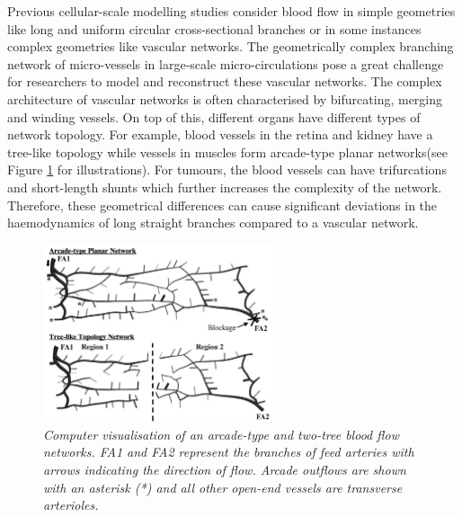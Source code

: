 \noindent Previous cellular-scale modelling studies consider blood flow in simple geometries like long and uniform circular cross-sectional branches or in some instances complex geometries like vascular networks. The geometrically complex branching network of micro-vessels in large-scale micro-circulations pose a great challenge for researchers to model and reconstruct these vascular networks. The complex architecture of vascular networks is often characterised by bifurcating, merging and winding vessels.\cite{fung2013biomechanics} On top of this, different organs have different types of network topology. For example, blood vessels in the retina and kidney have a tree-like topology\cite{LiYiwen2008Dlav} while vessels in muscles form arcade-type planar networks\cite{KianiM1994Fimb, tawfik2013mathematical}(see Figure \ref{BloodNetworkTopology} for illustrations). For tumours, the blood vessels can have trifurcations and short-length shunts which further increases the complexity of the network.\cite{TumorMicrovasculature} Therefore, these geometrical differences can cause significant deviations in the haemodynamics of long straight branches compared to a vascular network.

\begin{figure}[H]
\centering
\includegraphics[width=0.6\textwidth]{images/TopologyNetworks.png}
\caption{\textit{Computer visualisation of an arcade-type and two-tree blood flow networks.\cite{NetworkTopology2005} FA1 and FA2 represent the branches of feed arteries with arrows indicating the direction of flow. Arcade outflows are shown with an asterisk (*) and all other open-end vessels are transverse arterioles.} \label{BloodNetworkTopology}}
\end{figure}

